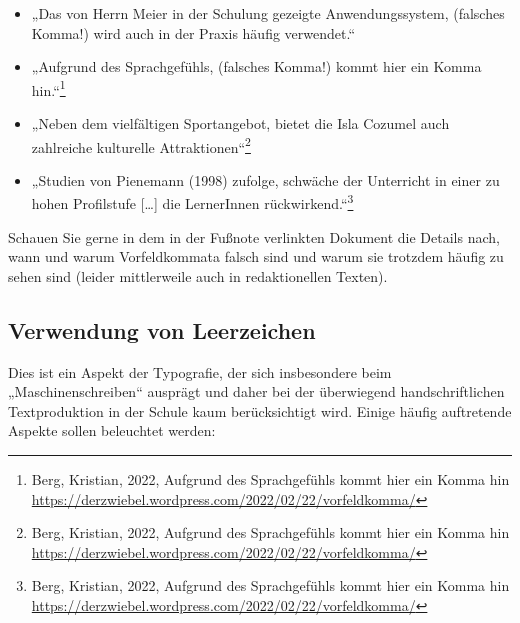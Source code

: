 \begin{itemize}
    \item „Das von Herrn Meier in der Schulung gezeigte Anwendungssystem, (falsches Komma!) wird auch in der Praxis häufig verwendet.“
    
    \item „Aufgrund des Sprachgefühls, (falsches Komma!) kommt hier ein Komma hin.“\footnote{Berg, Kristian, 2022, Aufgrund des Sprachgefühls kommt hier ein Komma hin \mbox{\url{https://derzwiebel.wordpress.com/2022/02/22/vorfeldkomma/}}}
    
    \item „Neben dem vielfältigen Sportangebot, bietet die Isla Cozumel auch zahlreiche kulturelle Attraktionen“\footnote{Berg, Kristian, 2022, Aufgrund des Sprachgefühls kommt hier ein Komma hin \mbox{\url{https://derzwiebel.wordpress.com/2022/02/22/vorfeldkomma/}}}
    
    \item „Studien von Pienemann (1998) zufolge, schwäche der Unterricht in einer zu hohen Profilstufe […] die LernerInnen rückwirkend.“\footnote{Berg, Kristian, 2022, Aufgrund des Sprachgefühls kommt hier ein Komma hin \mbox{\url{https://derzwiebel.wordpress.com/2022/02/22/vorfeldkomma/}}}
\end{itemize}

Schauen Sie gerne in dem in der Fußnote verlinkten Dokument die Details nach, wann und warum Vorfeldkommata falsch sind und warum sie trotzdem häufig zu sehen sind (leider mittlerweile auch in redaktionellen Texten).

\subsection{Verwendung von Leerzeichen}

Dies ist ein Aspekt der Typografie, der sich insbesondere beim „Maschinenschreiben“ ausprägt und daher bei der überwiegend handschriftlichen Textproduktion in der Schule kaum berücksichtigt wird. Einige häufig auftretende Aspekte sollen beleuchtet werden:

